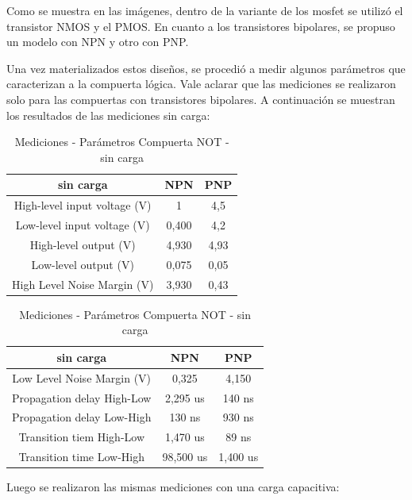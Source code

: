 Como se muestra en las imágenes, dentro de la variante de los mosfet
se utilizó el transistor NMOS y el PMOS. En cuanto a los transistores
bipolares, se propuso un modelo con NPN y otro con PNP.

Una vez materializados estos diseños, se procedió a medir algunos
parámetros que caracterizan a la compuerta lógica. Vale aclarar que
las mediciones se realizaron solo para las compuertas con transistores
bipolares.
\vspace{5mm}
A continuación se muestran los resultados de las mediciones sin carga:
\begin{center}
\begin{table}[H]
\begin{tabular}{|c|c|c|}
\hline 
sin carga & NPN & PNP\tabularnewline
\hline 
\hline 
High-level input voltage (V) & 1 & 4,5\tabularnewline
\hline 
Low-level input voltage (V) & 0,400 & 4,2\tabularnewline
\hline 
High-level output (V) & 4,930 & 4,93\tabularnewline
\hline 
Low-level output (V) & 0,075 & 0,05\tabularnewline
\hline 
High Level Noise Margin (V) & 3,930 & 0,43\tabularnewline
\hline 
\end{tabular}\hfill    
\begin{tabular}{|c|c|c|}
\hline 
sin carga & NPN & PNP\tabularnewline
\hline 
\hline 
Low Level Noise Margin (V) & 0,325 & 4,150\tabularnewline
\hline 
Propagation delay High-Low  & 2,295 us & 140 ns\tabularnewline
\hline 
Propagation delay Low-High & 130 ns & 930 ns\tabularnewline
\hline 
Transition tiem High-Low & 1,470 us & 89 ns\tabularnewline
\hline 
Transition time Low-High & 98,500 us & 1,400 us\tabularnewline
\hline 
\end{tabular}
\caption{Mediciones - Parámetros Compuerta NOT - sin carga}
\end{table}
\end{center}

Luego se realizaron las mismas mediciones con una carga capacitiva:

